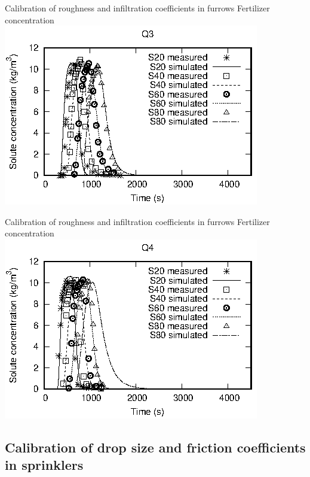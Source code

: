 \documentclass[10pt]{beamer}
\begin{document}
\begin{frame}{Calibration of roughness and infiltration coefficients in furrows}
{Fertilizer concentration}
	\includegraphics[width=\textwidth]{surcos-solute-q3.eps}
\end{frame}

\begin{frame}{Calibration of roughness and infiltration coefficients in furrows}
{Fertilizer concentration}
	\includegraphics[width=\textwidth]{surcos-solute-q4.eps}
\end{frame}

\subsection{Calibration of drop size and friction coefficients in sprinklers}
\end{document}
